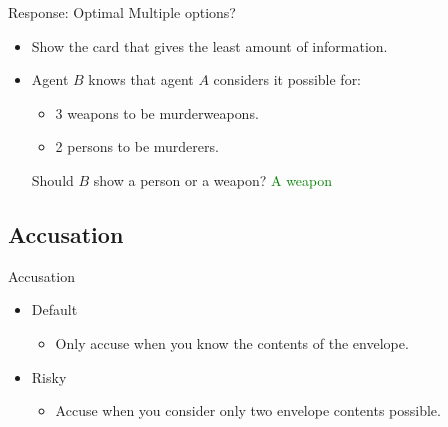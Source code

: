 \begin{frame}{Response: Optimal}
Multiple options?
  \begin{itemize}
  \item Show the card that gives the least amount of information.
  \item Agent $B$ knows that agent $A$ considers it possible for:
  \begin{itemize}
    \item 3 weapons to be murderweapons.
    \item 2 persons to be murderers. 
  \end{itemize}
  Should $B$ show a person or a weapon?  \textcolor{green}{A weapon}
  \end{itemize}
\end{frame}

\subsection{Accusation}
\begin{frame} {Accusation}
\begin{itemize}
  \item Default
  \begin{itemize}
   \item Only accuse when you know the contents of the envelope. 
  \end{itemize}
  
  \item Risky
  \begin{itemize}
  \item Accuse when you consider only two envelope contents possible.
  \end{itemize}

\end{itemize}
\end{frame} 


